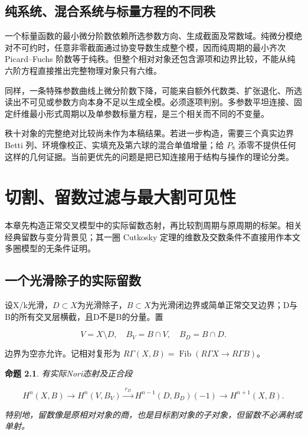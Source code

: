 \documentclass[11pt,a4paper,oneside]{ctexrep}
\theoremstyle{cnplain}
\newtheorem{proposition}[theorem]{命题}
\theoremstyle{definition}
\theoremstyle{remark}
\begin{document}
\section{纯系统、混合系统与标量方程的不同秩}
一个标量函数的最小微分阶数依赖所选参数方向、生成截面及常数域。纯微分模绝对不可约时，任意非零截面通过协变导数生成整个模，因而纯周期的最小齐次 Picard--Fuchs 阶数等于纯秩。但整个相对对象还包含源项和边界比较，不能从纯六阶方程直接推出完整物理对象只有六维。

同样，一条特殊参数曲线上微分阶数下降，可能来自额外代数类、扩张退化、所选读出不可见或参数方向本身不足以生成全模。必须逐项判别。多参数平坦连接、固定纤维最小形式周期以及单参数标量方程，是三个相关而不同的不变量。

秩十对象的完整绝对比较尚未作为本稿结果。若进一步构造，需要三个真实边界 Betti 列、环境像校正、实填充及第六球的混合单值增量；给 $P_8$ 添零不提供任何这样的几何证据。当前更优先的问题是把已知连接用于结构与操作的理论分类。


\chapter{切割、留数过滤与最大割可见性}\label{ch:cut}
本章先构造正常交叉模型中的实际留数态射，再比较割周期与原周期的标架。相关经典留数与变分背景见\cite{muhlbauer}；其一圈 Cutkosky 定理的维数及交数条件不直接用作本文多圈模型的无条件证明。
\section{一个光滑除子的实际留数}\label{sec:cut:2}

设X/k光滑，\(D\subset X\)为光滑除子，\(B\subset X\)为光滑闭边界或简单正常交叉边界；D与B的所有交叉层横截，且D不是B的分量。置

\begin{equation}
V=X\setminus D,\quad B_V=B\cap V,\quad B_D=B\cap D.
\end{equation}

边界为空亦允许。记相对复形为 \(R\Gamma(X,B)=\operatorname{Fib}(R\Gamma X\to R\Gamma B)\)。

\begin{proposition}

\label{thm:cut:2.1} 有实际Nori态射及正合段

\begin{equation}
H^n(X,B)\longrightarrow H^n(V,B_V)
 \xrightarrow{\ r_D\ }H^{n-1}(D,B_D)(-1)
 \longrightarrow H^{n+1}(X,B).                         \label{eq:cut:2.1}
\end{equation}

特别地，留数像是原相对对象的商，也是目标割对象的子对象，但留数不必满射或单射。

\end{proposition}
\end{document}
